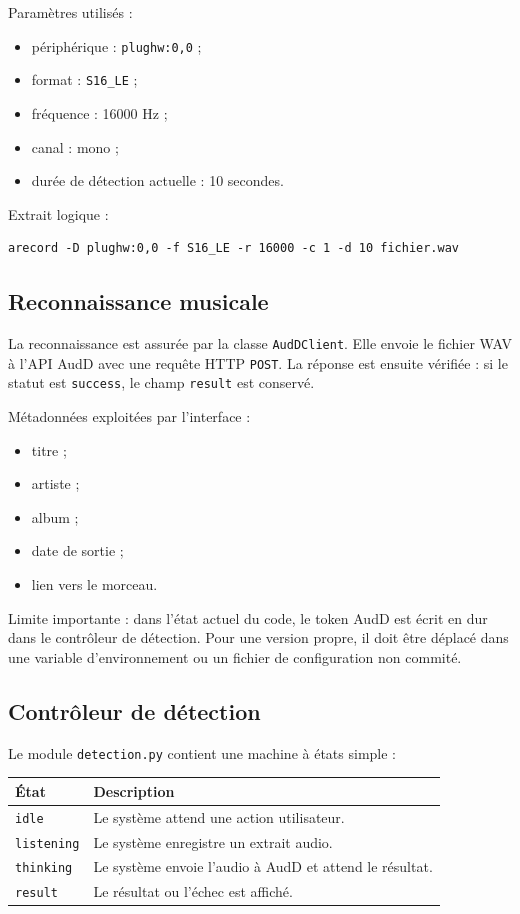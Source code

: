 Paramètres utilisés :

\begin{itemize}
    \item périphérique : \texttt{plughw:0,0} ;
    \item format : \texttt{S16\_LE} ;
    \item fréquence : 16000 Hz ;
    \item canal : mono ;
    \item durée de détection actuelle : 10 secondes.
\end{itemize}

Extrait logique :

\begin{lstlisting}
arecord -D plughw:0,0 -f S16_LE -r 16000 -c 1 -d 10 fichier.wav
\end{lstlisting}

\subsection{Reconnaissance musicale}

La reconnaissance est assurée par la classe \texttt{AudDClient}. Elle envoie le
fichier WAV à l'API AudD avec une requête HTTP \texttt{POST}. La réponse est
ensuite vérifiée : si le statut est \texttt{success}, le champ \texttt{result}
est conservé.

Métadonnées exploitées par l'interface :

\begin{itemize}
    \item titre ;
    \item artiste ;
    \item album ;
    \item date de sortie ;
    \item lien vers le morceau.
\end{itemize}

Limite importante : dans l'état actuel du code, le token AudD est écrit en dur
dans le contrôleur de détection. Pour une version propre, il doit être déplacé
dans une variable d'environnement ou un fichier de configuration non commité.

\subsection{Contrôleur de détection}

Le module \texttt{detection.py} contient une machine à états simple :

\begin{longtable}{|p{3cm}|p{10cm}|}
\hline
\textbf{État} & \textbf{Description} \\
\hline
\texttt{idle} & Le système attend une action utilisateur. \\
\hline
\texttt{listening} & Le système enregistre un extrait audio. \\
\hline
\texttt{thinking} & Le système envoie l'audio à AudD et attend le résultat. \\
\hline
\texttt{result} & Le résultat ou l'échec est affiché. \\
\hline
\end{longtable}

